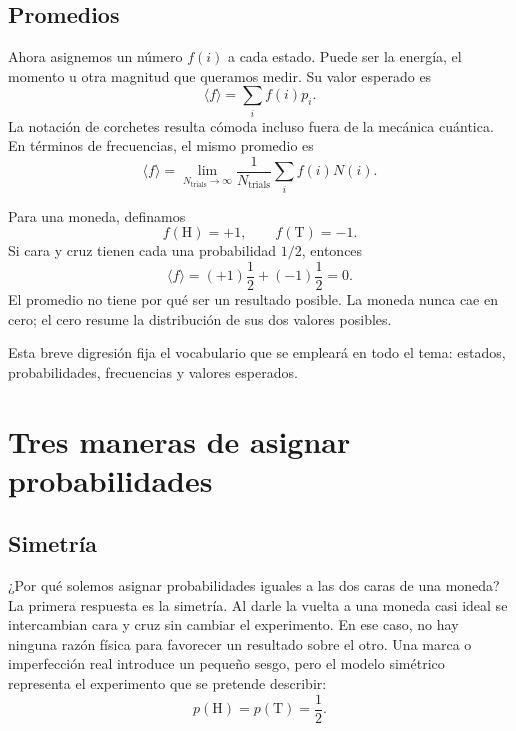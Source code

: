 \subsection{Promedios}

Ahora asignemos un número \(f(i)\) a cada estado. Puede ser la energía, el momento u otra magnitud que queramos medir. Su valor esperado es
\begin{equation}
 \langle f\rangle=\sum_i f(i)p_i.
 \label{eq:sm1-expectation}
\end{equation}
La notación de corchetes resulta cómoda incluso fuera de la mecánica cuántica. En términos de frecuencias, el mismo promedio es
\begin{equation}
 \langle f\rangle
 =
 \lim_{N_{\mathrm{trials}}\to\infty}
 \frac{1}{N_{\mathrm{trials}}}
 \sum_i f(i)N(i).
 \label{eq:sm1-frequency-average}
\end{equation}

Para una moneda, definamos
\begin{equation}
 f(\mathrm{H})=+1,
 \qquad
 f(\mathrm{T})=-1.
\end{equation}
Si cara y cruz tienen cada una probabilidad \(1/2\), entonces
\begin{equation}
 \langle f\rangle
 =(+1)\frac12+(-1)\frac12=0.
\end{equation}
El promedio no tiene por qué ser un resultado posible. La moneda nunca cae en cero; el cero resume la distribución de sus dos valores posibles.

Esta breve digresión fija el vocabulario que se empleará en todo el tema: estados, probabilidades, frecuencias y valores esperados.

\section{Tres maneras de asignar probabilidades}

\subsection{Simetría}

¿Por qué solemos asignar probabilidades iguales a las dos caras de una moneda? La primera respuesta es la simetría. Al darle la vuelta a una moneda casi ideal se intercambian cara y cruz sin cambiar el experimento. En ese caso, no hay ninguna razón física para favorecer un resultado sobre el otro. Una marca o imperfección real introduce un pequeño sesgo, pero el modelo simétrico representa el experimento que se pretende describir:
\begin{equation}
 p(\mathrm{H})=p(\mathrm{T})=\frac12.
\end{equation}

